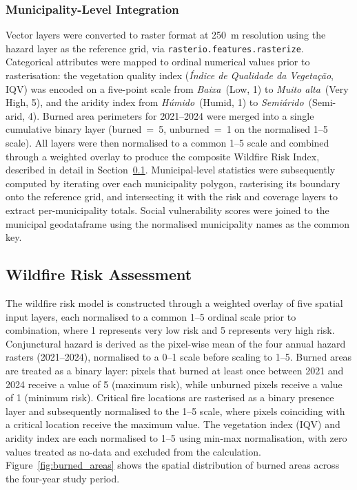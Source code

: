 \subsubsection*{Municipality-Level Integration}
Vector layers were converted to raster format at 250~m resolution using the
hazard layer as the reference grid, via \texttt{rasterio.features.rasterize}.
Categorical attributes were mapped to ordinal numerical values prior to
rasterisation: the vegetation quality index (\textit{Índice de Qualidade da
Vegetação}, IQV) was encoded on a five-point scale from \textit{Baixa}~(Low,
1) to \textit{Muito alta}~(Very High, 5), and the aridity index from
\textit{Húmido}~(Humid, 1) to \textit{Semiárido}~(Semi-arid, 4). Burned
area perimeters for 2021--2024 were merged into a single cumulative binary
layer (burned~=~5, unburned~=~1 on the normalised 1--5 scale). All layers
were then normalised to a common 1--5 scale and combined through a weighted
overlay to produce the composite Wildfire Risk Index, described in detail in
Section~\ref{subsec:wildfire-risk-assessment}. Municipal-level statistics were
subsequently computed by iterating over each municipality polygon, rasterising
its boundary onto the reference grid, and intersecting it with the risk and
coverage layers to extract per-municipality totals. Social vulnerability scores
were joined to the municipal geodataframe using the normalised municipality
names as the common key.\\


\subsection{Wildfire Risk Assessment}
\label{subsec:wildfire-risk-assessment}

The wildfire risk model is constructed through a weighted overlay of five
spatial input layers, each normalised to a common 1--5 ordinal scale prior
to combination, where 1 represents very low risk and 5 represents very
high risk. Conjunctural hazard is derived as the pixel-wise mean of the
four annual hazard rasters (2021--2024), normalised to a 0--1 scale before
scaling to 1--5. Burned areas are treated as a binary layer: pixels that
burned at least once between 2021 and 2024 receive a value of 5 (maximum
risk), while unburned pixels receive a value of 1 (minimum risk). Critical
fire locations are rasterised as a binary presence layer and subsequently
normalised to the 1--5 scale, where pixels coinciding with a critical
location receive the maximum value. The vegetation index (IQV) and aridity
index are each normalised to 1--5 using min-max normalisation, with zero
values treated as no-data and excluded from the calculation.
\newpage
Figure~\ref{fig:burned_areas} shows the spatial distribution of burned
areas across the four-year study period.

